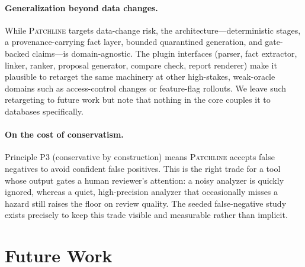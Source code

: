 \documentclass[11pt]{article}
\newcommand{\tool}{\textsc{Patchline}}
\begin{document}
\paragraph{Generalization beyond data changes.} While \tool{} targets data-change risk, the
architecture---deterministic stages, a provenance-carrying fact layer, bounded quarantined generation,
and gate-backed claims---is domain-agnostic. The plugin interfaces (parser, fact extractor, linker,
ranker, proposal generator, compare check, report renderer) make it plausible to retarget the same
machinery at other high-stakes, weak-oracle domains such as access-control changes or feature-flag
rollouts. We leave such retargeting to future work but note that nothing in the core couples it to
databases specifically.

\paragraph{On the cost of conservatism.} Principle P3 (conservative by construction) means \tool{}
accepts false negatives to avoid confident false positives. This is the right trade for a tool whose
output gates a human reviewer's attention: a noisy analyzer is quickly ignored, whereas a quiet,
high-precision analyzer that occasionally misses a hazard still raises the floor on review quality. The
seeded false-negative study exists precisely to keep this trade visible and measurable rather than
implicit.

\section{Future Work}
\end{document}
